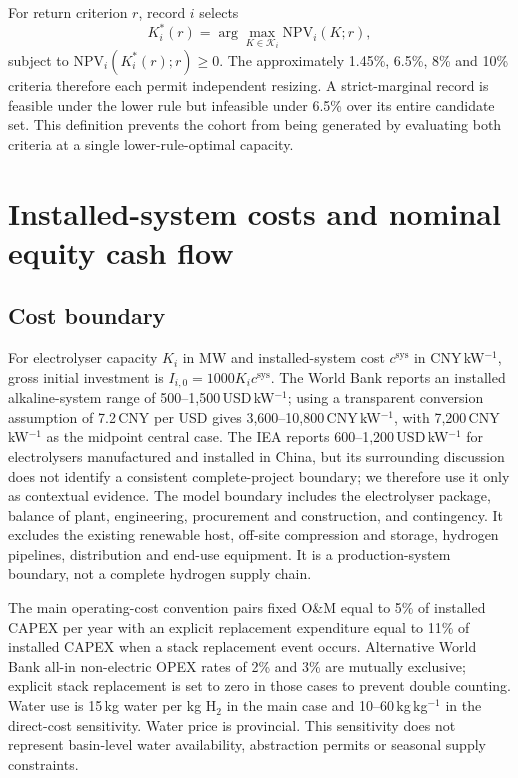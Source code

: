 \documentclass[pdflatex,sn-nature]{sn-jnl}
\newcommand{\lowhurdle}{approximately 1.45\%}
\begin{document}
For return criterion $r$, record $i$ selects
\begin{equation}
K_i^*(r)=\arg\max_{K\in\mathcal{K}_i}\mathrm{NPV}_i(K;r),
\label{eq:capacitychoice}
\end{equation}
subject to $\mathrm{NPV}_i(K_i^*(r);r)\geq0$. The \lowhurdle, 6.5\%, 8\% and 10\% criteria therefore each permit independent resizing. A strict-marginal record is feasible under the lower rule but infeasible under 6.5\% over its entire candidate set. This definition prevents the cohort from being generated by evaluating both criteria at a single lower-rule-optimal capacity.

\section{Installed-system costs and nominal equity cash flow}\label{sec:finance}

\subsection{Cost boundary}

For electrolyser capacity $K_i$ in MW and installed-system cost $c^{\mathrm{sys}}$ in CNY\,kW$^{-1}$, gross initial investment is $I_{i,0}=1000K_i c^{\mathrm{sys}}$. The World Bank reports an installed alkaline-system range of 500--1,500\,USD\,kW$^{-1}$; using a transparent conversion assumption of 7.2\,CNY per USD gives 3,600--10,800\,CNY\,kW$^{-1}$, with 7,200\,CNY\,kW$^{-1}$ as the midpoint central case\cite{worldbank2026}. The IEA reports 600--1,200\,USD\,kW$^{-1}$ for electrolysers manufactured and installed in China, but its surrounding discussion does not identify a consistent complete-project boundary; we therefore use it only as contextual evidence\cite{iea2025}. The model boundary includes the electrolyser package, balance of plant, engineering, procurement and construction, and contingency. It excludes the existing renewable host, off-site compression and storage, hydrogen pipelines, distribution and end-use equipment. It is a production-system boundary, not a complete hydrogen supply chain.

The main operating-cost convention pairs fixed O\&M equal to 5\% of installed CAPEX per year with an explicit replacement expenditure equal to 11\% of installed CAPEX when a stack replacement event occurs\cite{doe2024}. Alternative World Bank all-in non-electric OPEX rates of 2\% and 3\% are mutually exclusive; explicit stack replacement is set to zero in those cases to prevent double counting\cite{worldbank2026}. Water use is 15\,kg water per kg H$_2$ in the main case and 10--60\,kg\,kg$^{-1}$ in the direct-cost sensitivity. Water price is provincial. This sensitivity does not represent basin-level water availability, abstraction permits or seasonal supply constraints.
\end{document}
